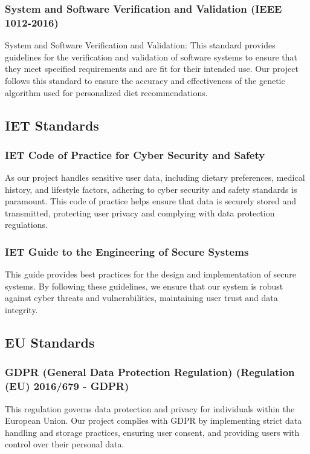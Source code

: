 \documentclass[a4paper,12pt]{article}
\begin{document}
\subsubsection{System and Software Verification and Validation (IEEE 1012-2016)}
System and Software Verification and Validation: This standard provides guidelines for the verification and validation of software systems to ensure that they meet specified requirements and are fit for their intended use. Our project follows this standard to ensure the accuracy and effectiveness of the genetic algorithm used for personalized diet recommendations.\cite{ieee1012}


\subsection{IET Standards}
\subsubsection{IET Code of Practice for Cyber Security and Safety}
As our project handles sensitive user data, including dietary preferences, medical history, and lifestyle factors, adhering to cyber security and safety standards is paramount. This code of practice helps ensure that data is securely stored and transmitted, protecting user privacy and complying with data protection regulations.\cite{iet2020}


\subsubsection{IET Guide to the Engineering of Secure Systems}
This guide provides best practices for the design and implementation of secure systems. By following these guidelines, we ensure that our system is robust against cyber threats and vulnerabilities, maintaining user trust and data integrity. \cite{iet2016}


\subsection{EU Standards}
\subsubsection{GDPR (General Data Protection Regulation) (Regulation (EU) 2016/679 - GDPR)}
This regulation governs data protection and privacy for individuals within the European Union. Our project complies with GDPR by implementing strict data handling and storage practices, ensuring user consent, and providing users with control over their personal data. \cite{gdpr2016}
\end{document}
